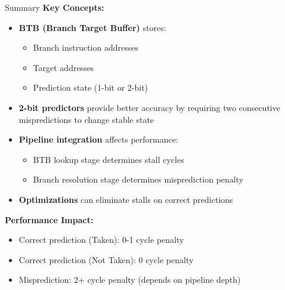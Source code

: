 \documentclass[aspectratio=169,12pt]{beamer}
\begin{document}
\begin{frame}{Summary}
\textbf{Key Concepts:}
\begin{itemize}
    \item \textbf{BTB (Branch Target Buffer)} stores:
    \begin{itemize}
        \item Branch instruction addresses
        \item Target addresses
        \item Prediction state (1-bit or 2-bit)
    \end{itemize}
    \item \textbf{2-bit predictors} provide better accuracy by requiring two consecutive mispredictions to change stable state
    \item \textbf{Pipeline integration} affects performance:
    \begin{itemize}
        \item BTB lookup stage determines stall cycles
        \item Branch resolution stage determines misprediction penalty
    \end{itemize}
    \item \textbf{Optimizations} can eliminate stalls on correct predictions
\end{itemize}

\textbf{Performance Impact:}
\begin{itemize}
    \item Correct prediction (Taken): 0-1 cycle penalty
    \item Correct prediction (Not Taken): 0 cycle penalty
    \item Misprediction: 2+ cycle penalty (depends on pipeline depth)
\end{itemize}
\end{frame}
\end{document}
